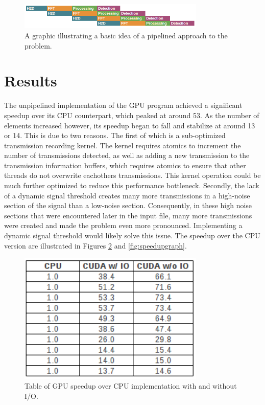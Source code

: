 \documentclass[conference]{IEEEtran}
\begin{document}
\begin{figure}[ht!]
\centering
\includegraphics[width=3.5in]{pipeline.png}
\caption{A graphic illustrating a basic idea of a pipelined approach to the problem.}
\label{fig:pipeline}
\end{figure}

\section{Results}

The unpipelined implementation of the GPU program achieved a significant speedup
over its CPU counterpart, which peaked at around 53. As the number of elements
increased however, its speedup began to fall and stabilize at around 13 or 14. This
is due to two reasons. The first of which is a sub-optimized transmission recording
kernel. The kernel requires atomics to increment the number of transmissions detected,
as well as adding a new transmission to the transmission information buffers, which 
requires atomics to ensure that other threads do not overwrite eachothers 
transmissions. This kernel operation could be much further optimized to reduce this
performance bottleneck. Secondly, the lack of a dynamic signal threshold creates
many more transmissions in a high-noise section of the signal than a low-noise
section. Consequently, in these high noise sections that were encountered later
in the input file, many more transmissions were created and made the problem even
more pronounced. Implementing a dynamic signal threshold would likely solve this
issue. The speedup over the CPU version are illustrated in Figures \ref{fig:speedup}
and \ref{fig:speedupgraph}.

\begin{figure}[ht!]
\centering
\includegraphics[width=3.5in]{speedup.png}
\caption{Table of GPU speedup over CPU implementation with and without I/O.}
\label{fig:speedup}
\end{figure}
\end{document}
